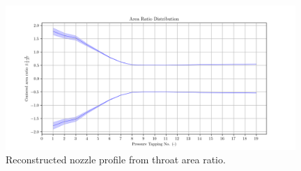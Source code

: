 \documentclass{article}
\begin{document}
\begin{figure}[H]
    \centering
    \includegraphics[width=0.98\textwidth]{../Supersonic_Nozzle/area_ratio_distribution.png}
    \caption{Reconstructed nozzle profile from throat area ratio.}
    \label{fig:area_distribution}
\end{figure}
\end{document}
